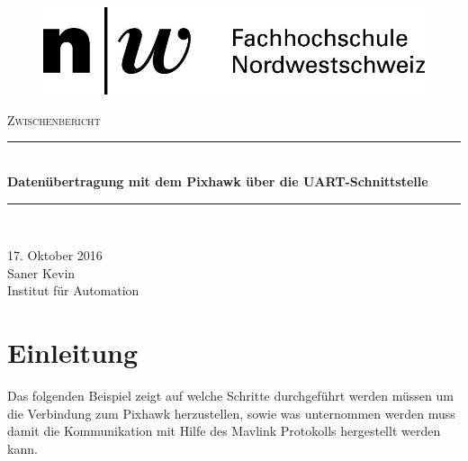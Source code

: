 \documentclass[12pt]{article} %
\begin{document}
	
	\begin{titlepage}
		
		\newcommand{\HRule}{\rule{\linewidth}{0.5mm}} %
		
		\centering %
		
		\begin{figure}[h] 
			\centering
			\includegraphics[width=.4\textwidth]{Logo-FHNW}
		\end{figure}
		
		\textsc{\Large Zwischenbericht}\\[0.5cm] %
		\begin{doublespace}
			\HRule \\[1cm]
			{ \huge \bfseries Datenübertragung mit dem Pixhawk über die UART-Schnittstelle }\\[1cm] %
			\HRule \\[1cm]
		\end{doublespace}

		{\large 17. Oktober 2016}\\[1cm] %
		
		{\large Saner Kevin}\\[1cm]
		{\large Institut für Automation}
		
		\vfill %
		
	\end{titlepage}
	
	\setcounter{page}{1}
	\pagestyle{fancy}
	\rfoot{\thepage}
	
	\section{Einleitung}
	Das folgenden Beispiel zeigt auf welche Schritte durchgeführt werden müssen um die Verbindung zum Pixhawk herzustellen, sowie was unternommen werden muss damit die Kommunikation mit Hilfe des Mavlink Protokolls hergestellt werden kann. 
\end{document}
